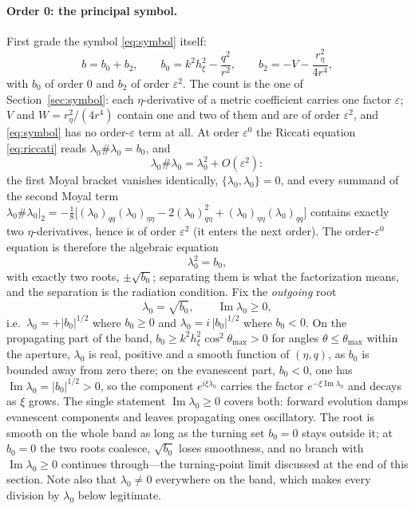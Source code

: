 \documentclass[11pt]{article}
\begin{document}
\paragraph{Order 0: the principal symbol.} First grade the symbol
\eqref{eq:symbol} itself:
\[
b=b_0+b_2,\qquad
b_0=k^2h_\xi^2-\frac{q^2}{r^2},\qquad
b_2=-V-\frac{r_\eta^2}{4r^4},
\]
with $b_0$ of order $0$ and $b_2$ of order $\varepsilon^2$. The count is the
one of Section~\ref{sec:symbol}: each $\eta$-derivative of a metric
coefficient carries one factor $\varepsilon$; $V$ and $W=r_\eta^2/(4r^4)$
contain one and two of them and are of order $\varepsilon^2$, and
\eqref{eq:symbol} has no order-$\varepsilon$ term at all. At order
$\varepsilon^0$ the Riccati equation \eqref{eq:riccati} reads
$\lambda_0\#\lambda_0=b_0$, and
\[
\lambda_0\#\lambda_0=\lambda_0^2+O(\varepsilon^2):
\]
the first Moyal bracket vanishes identically,
$\{\lambda_0,\lambda_0\}=0$, and every summand of the second Moyal term
$\lambda_0\#\lambda_0\bigr|_{2}
=-\tfrac18\bigl[(\lambda_0)_{qq}(\lambda_0)_{\eta\eta}
-2(\lambda_0)_{q\eta}^2+(\lambda_0)_{\eta\eta}(\lambda_0)_{qq}\bigr]$
contains exactly two $\eta$-derivatives, hence is of order $\varepsilon^2$
(it enters the next order). The order-$\varepsilon^0$ equation is therefore
the algebraic equation
\[
\lambda_0^2=b_0 ,
\]
with exactly two roots, $\pm\sqrt{b_0}$; separating them is what the
factorization means, and the separation is the radiation condition. Fix the
\emph{outgoing} root
\[
\lambda_0=\sqrt{b_0},\qquad \operatorname{Im}\lambda_0\ge0 ,
\]
i.e.\ $\lambda_0=+|b_0|^{1/2}$ where $b_0\ge0$ and
$\lambda_0=i\,|b_0|^{1/2}$ where $b_0<0$. On the propagating part of the
band, $b_0\ge k^2h_\xi^2\cos^2\theta_{\max}>0$ for angles
$\theta\le\theta_{\max}$ within the aperture, $\lambda_0$ is real, positive
and a smooth function of $(\eta,q)$, as $b_0$ is bounded away from zero
there; on the evanescent part, $b_0<0$, one has
$\operatorname{Im}\lambda_0=|b_0|^{1/2}>0$, so the component
$e^{i\xi\lambda_0}$ carries the factor $e^{-\xi\operatorname{Im}\lambda_0}$
and decays as $\xi$ grows. The single statement
$\operatorname{Im}\lambda_0\ge0$ covers both: forward evolution damps
evanescent components and leaves propagating ones oscillatory. The root is
smooth on the whole band as long as the turning set $b_0=0$ stays outside
it; at $b_0=0$ the two roots coalesce, $\sqrt{b_0}$ loses smoothness, and no
branch with $\operatorname{Im}\lambda_0\ge0$ continues through---the
turning-point limit discussed at the end of this section. Note also that
$\lambda_0\neq0$ everywhere on the band, which makes every division by
$\lambda_0$ below legitimate.
\end{document}

